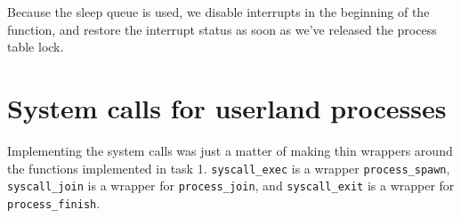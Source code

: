 \documentclass{article}
\begin{document}
Because the sleep queue is used, we disable interrupts in the beginning of the function, and restore the interrupt status as soon as we've released the process table lock.

\section{System calls for userland processes}
Implementing the system calls was just a matter of making thin wrappers around the functions implemented in task 1. \texttt{syscall\_exec} is a wrapper \texttt{process\_spawn}, \texttt{syscall\_join} is a wrapper for \texttt{process\_join}, and \texttt{syscall\_exit} is a wrapper for \texttt{process\_finish}.
\end{document}
